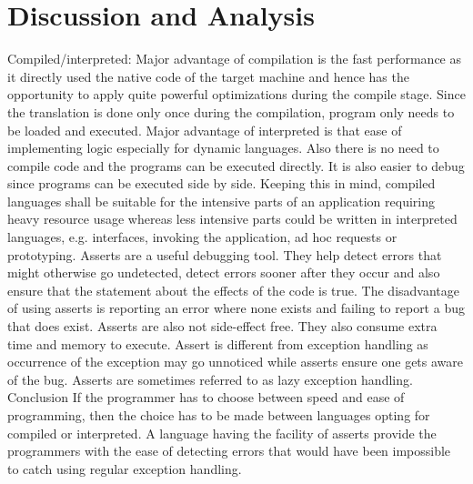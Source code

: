 \documentclass{sig-alternate}
\begin{document}
\section{Discussion and Analysis}
Compiled/interpreted: Major advantage of compilation is the fast performance as it directly used the native code of the target machine and hence has the opportunity to apply quite powerful optimizations during the compile stage. Since the translation is done only once during the compilation, program only needs to be loaded and executed. Major advantage of interpreted is that ease of implementing logic especially for dynamic languages. Also there is no need to compile code and the programs can be executed directly. It is also easier to debug since programs can be executed side by side. Keeping this in mind, compiled languages shall be suitable for the intensive parts of an application requiring heavy resource usage whereas less intensive parts could be written in interpreted languages, e.g. interfaces, invoking the application, ad hoc requests or prototyping.
Asserts are a useful debugging tool. They help detect errors that might otherwise go undetected, detect errors sooner after they occur and also ensure that the statement about the effects of the code is true. The disadvantage of using asserts is reporting an error where none exists and failing to report a bug that does exist. Asserts are also not side-effect free. They also consume extra time and memory to execute. Assert is different from exception handling as occurrence of the exception may go unnoticed while asserts ensure one gets aware of the bug. Asserts are sometimes referred to as lazy exception handling.
Conclusion
If the programmer has to choose between speed and ease of programming, then the choice has to be made between languages opting for compiled or interpreted. A language having the facility of asserts provide the programmers with the ease of detecting errors that would have been impossible to catch using regular exception handling.
\end{document}
